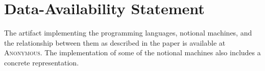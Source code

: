 \section*{Data-Availability Statement}
The artifact implementing
the programming languages, notional machines, and the relationship between them as described in the paper
is available at
\textsc{Anonymous}.
The implementation of some of the notional machines also includes a concrete representation.

